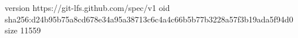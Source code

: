 version https://git-lfs.github.com/spec/v1
oid sha256:d24b95b75a8cd678e34a95a38713c6c4a4c66b5b77b3228a57f3b19ada5f94d0
size 11559
